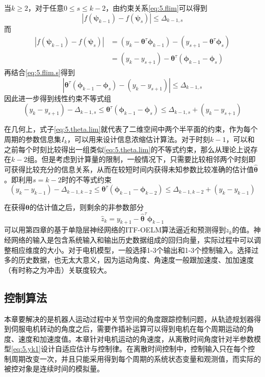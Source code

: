 当$k\geq2$，对于任意$0\leq s\leq k-2$，由约束关系\eqref{eq:5.flim}可以得到
\begin{equation}\label{eq:5.flim.s}
|f(\bm{\psi}_{k-1})-f(\bm{\psi}_{s})|\leq \Delta_{k-1,s}
\end{equation}
而
\begin{equation*}
\begin{split}%
|f(\bm{\psi}_{k-1})-f(\bm{\psi}_{s})|&=(y_{k}-\bm{\theta}^{\tau}\bm{\phi}_{k-1})-(y_{s+1}-\bm{\theta}^{\tau}\bm{\phi}_{s})\\
&=(y_{k}-y_{s+1})-\bm{\theta}^{\tau}(\bm{\phi}_{k-1}-\bm{\phi}_{s})
\end{split}
\end{equation*}
再结合\eqref{eq:5.flim.s}得到
\begin{equation}\label{eq:5.}
|\bm{\theta}^{\tau}(\bm{\phi}_{k-1}-\bm{\phi}_{s})-(y_{k}-y_{s+1})| \leq \Delta_{k-1,s}
\end{equation}
因此进一步得到线性约束不等式组
\begin{equation}\label{eq:5.theta.lim}
(y_{k}-y_{s+1})-\Delta_{k-1,s}\leq\bm{\theta}^{\tau}(\bm{\phi}_{k-1}-\bm{\phi}_{s})\leq\Delta_{k-1,s}+(y_{k}-y_{s+1})
\end{equation}

在几何上，式子\eqref{eq:5.theta.lim}就代表了二维空间中两个半平面的约束，作为每个周期的参数信息集$I_{k}$，可以用来设计信息浓缩估计算法。对于时刻$k-1$，可以和之前每个时刻比较得出一组类似\eqref{eq:5.theta.lim}的不等式约束，那么从理论上说存在$k-2$组。但是考虑到计算量的限制，一般情况下，只需要比较相邻两个时刻即可获得比较充分的信息关系，从而在较短时间内获得未知参数比较准确的估计值$\hat{\bm{\theta}}$。即利用$s=k-2$时的不等式约束
\begin{equation}\label{eq:5.theta.lim}
(y_{k}-y_{k-1})-\Delta_{k-1,k-2}\leq\bm{\theta}^{\tau}(\bm{\phi}_{k-1}-\bm{\phi}_{k-2})\leq\Delta_{k-1,k-2}+(y_{k}-y_{k-1})
\end{equation}

在获得$\bm{\theta}$的估计值之后，则剩余的非参数部分
$$\hat{z}_{k}=y_{k+1}-\hat{\bm{\theta}}^{\tau}\bm{\phi}_{k-1}$$
可以用第四章的基于单隐层神经网络的ITF-OELM算法逼近和预测得到$\breve{z}_{k}$的值。神经网络的输入是包含系统输入和输出历史数据组成的回归向量，实际过程中可以调整相应维度的大小。对于电机模型，一般选择1-3个输出和1-3个控制输入。选择过多的历史数据，也无太大意义，因为运动角度、角速度一般跟加速度、加加速度（有时称之为冲击）关联度较大。

\subsection{控制算法}\label{5.2.3}
本章要解决的是机器人运动过程中关节空间的角度跟踪控制问题，从轨迹规划器得到伺服电机转动的角度之后，需要作插补运算可以得到电机在每个周期运动的角度、速度和加速度值。本章针对电机运动的角速度，从离散时间角度针对半参数模型\eqref{eq:5.yk1}设计自适应估计与控制律。在离散时间控制中，控制输入只在每个控制周期改变一次，并且只能采用得到每个周期的系统状态变量和观测值，而实际的被控对象是连续时间的模拟量。

